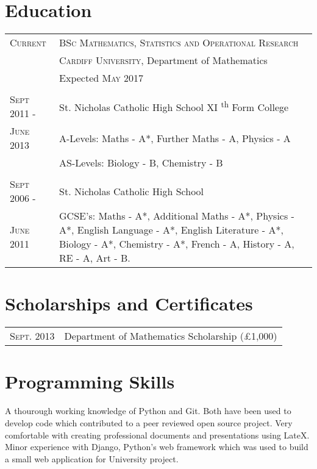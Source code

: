 \documentclass[a4paper, 11pt]{article}
\begin{document}
\section{Education}
\begin{tabularx}{\textwidth}{lX}

\textsc{Current} & \textsc{BSc Mathematics, Statistics and Operational Research} \\
&\normalsize \textsc{Cardiff University}, Department of Mathematics\\
& Expected \textsc{May} 2017\\
\\
\textsc{Sept 2011 -} & St. Nicholas Catholic High School XI \textsuperscript{th} Form College\\
\textsc{June 2013} & A-Levels: Maths - A*, Further Maths - A, Physics - A\\
& AS-Levels: Biology - B, Chemistry - B\\
\\
\textsc{Sept 2006 -} & St. Nicholas Catholic High School\\
\textsc{June 2011} & GCSE's: Maths - A*, Additional Maths - A*, Physics - A*, English Language - A*, English Literature - A*, Biology - A*, Chemistry - A*, French - A, History - A, RE - A, Art - B.\\

\end{tabularx}
\section{Scholarships and Certificates}
\begin{tabularx}{\textwidth}{lX}

\textsc{Sept.} 2013 & Department of Mathematics Scholarship (\pounds1,000)\\

\end{tabularx}
\section{Programming Skills}
A thourough working knowledge of Python and Git. Both have been used to develop code which contributed to a peer reviewed open source project. Very comfortable with creating professional documents and presentations using LateX. Minor experience with Django, Python's web framework which was used to build a small web application for University project.
\end{document}
